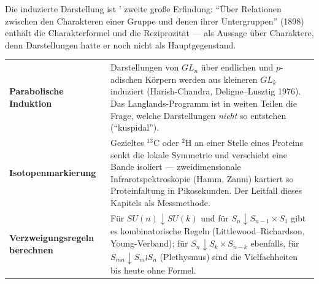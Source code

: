 \begin{geschichte}
Die induzierte Darstellung ist ' zweite große Erfindung: \enquote{Über Relationen zwischen den Charakteren einer Gruppe und denen ihrer Untergruppen} (1898) enthält die Charakterformel und die Reziprozität --- als Aussage über Charaktere, denn Darstellungen hatte er noch nicht als Hauptgegenstand.

\begin{center}
\begin{minipage}{0.9\textwidth}
\end{minipage}
\end{center}
\end{geschichte}

\begin{forschung}
\begin{center}
{\small
\renewcommand{\arraystretch}{1.45}
\begin{tabular}{@{}P{3.0cm}P{5.2cm}@{}}
\toprule
\textbf{Parabolische Induktion} & Darstellungen von $GL_n$ über endlichen und $p$-adischen Körpern werden aus kleineren $GL_k$ induziert (Harish-Chandra, Deligne--Lusztig 1976). Das Langlands-Programm ist in weiten Teilen die Frage, welche Darstellungen \emph{nicht} so entstehen (\enquote{kuspidal}).\\
\textbf{Isotopen\-markierung} & Gezieltes $^{13}\mathrm{C}$ oder $^{2}\mathrm{H}$ an einer Stelle eines Proteins senkt die lokale Symmetrie und verschiebt eine Bande isoliert --- zweidimensionale Infrarotspektroskopie (Hamm, Zanni) kartiert so Proteinfaltung in Pikosekunden. Der Leitfall dieses Kapitels als Messmethode.\\
\textbf{Verzweigungs\-regeln berechnen} & Für $SU(n)\downarrow SU(k)$ und für $S_n\downarrow S_{n-1}\times S_1$ gibt es kombinatorische Regeln (Littlewood--Richardson, Young-Verband); für $S_n\downarrow S_k\times S_{n-k}$ ebenfalls, für $S_{mn}\downarrow S_m\wr S_n$ (Plethysmus) sind die Vielfachheiten bis heute ohne Formel.\\
\bottomrule
\end{tabular}}
\end{center}
\end{forschung}

